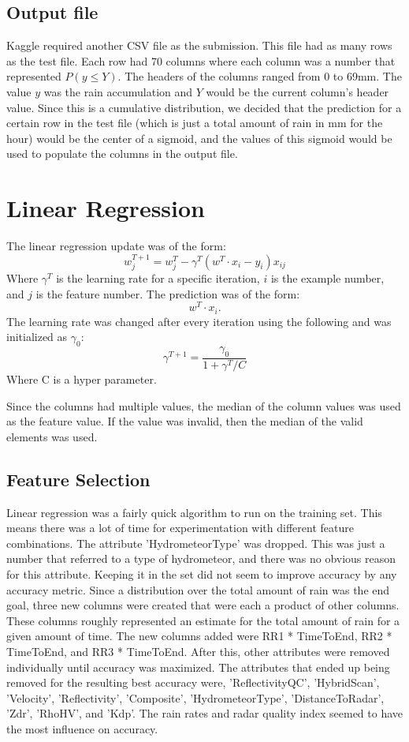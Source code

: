 \documentclass[pdftex,a4paper,12pt]{article}
\begin{document}
\subsection{Output file}
Kaggle required another CSV file as the submission. This file had as many rows as the test file. Each row had 70 columns where each column was a number that represented $P(y \le Y)$. The headers of the columns ranged from 0 to 69mm. The value $y$ was the rain accumulation and $Y$ would be the current column's header value. Since this is a cumulative distribution, we decided that the prediction for a certain row in the test file (which is just a total amount of rain in mm for the hour) would be the center of a sigmoid, and the values of this sigmoid would be used to populate the columns in the output file.




\section{Linear Regression}
The linear regression update was of the form:
$$w^{T + 1}_j = w^{T}_j - \gamma^T(w^{T} \cdot x_{i} - y_i)x_{ij}$$
Where $\gamma^T$ is the learning rate for a specific iteration, $i$ is the example number, and $j$ is the feature number. The prediction was of the form:
$$w^{T} \cdot x_{i}.$$
The learning rate was changed after every iteration using the following and was initialized as $\gamma_0$:
$$\gamma^{T + 1} = \frac{\gamma_{0}}{1 + \gamma^{T} / C}$$
Where C is a hyper parameter.




Since the columns had multiple values, the median of the column values was used as the feature value. If the value was invalid, then the median of the valid elements was used.
\subsection{Feature Selection}
Linear regression was a fairly quick algorithm to run on the training set. This means there was a lot of time for experimentation with different feature combinations. The attribute 'HydrometeorType' was dropped. This was just a number that referred to a type of hydrometeor, and there was no obvious reason for this attribute. Keeping it in the set did not seem to improve accuracy by any accuracy metric. Since a distribution over the total amount of rain was the end goal, three new columns were created that were each a product of other columns. These columns roughly represented an estimate for the total amount of rain for a given amount of time. The new columns added were RR1 * TimeToEnd, RR2 * TimeToEnd, and RR3 * TimeToEnd. After this, other attributes were removed individually until accuracy was maximized. The attributes that ended up being removed for the resulting best accuracy were, 'ReflectivityQC', 'HybridScan', 'Velocity', 'Reflectivity', 'Composite', 'HydrometeorType', 'DistanceToRadar', 'Zdr', 'RhoHV', and 'Kdp'. The rain rates and radar quality index seemed to have the most influence on accuracy.
\end{document}
